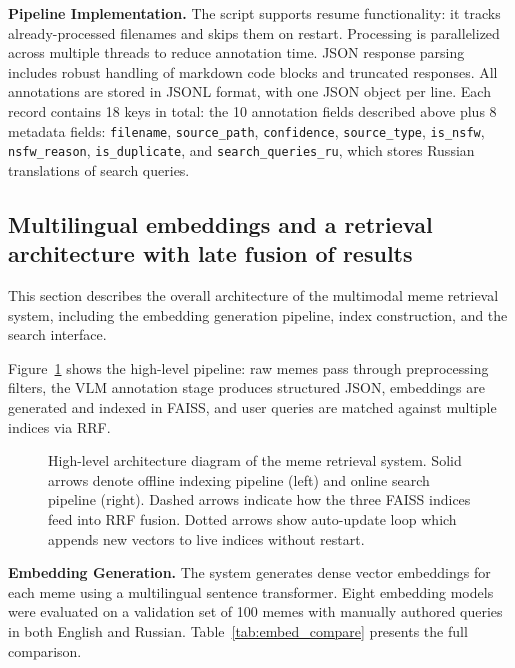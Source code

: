 \documentclass[a4paper,12pt]{article}
\begin{document}
\textbf{Pipeline Implementation.} The script supports resume functionality: it tracks already-processed filenames and skips them on restart. Processing is parallelized across multiple threads to reduce annotation time. JSON response parsing includes robust handling of markdown code blocks and truncated responses. All annotations are stored in JSONL format, with one JSON object per line. Each record contains 18 keys in total: the 10 annotation fields described above plus 8 metadata fields: \texttt{filename}, \texttt{source\_path}, \texttt{confidence}, \texttt{source\_type}, \texttt{is\_nsfw}, \texttt{nsfw\_reason}, \texttt{is\_duplicate}, and \texttt{search\_queries\_ru}, which stores Russian translations of search queries.

\subsection{Multilingual embeddings and a retrieval architecture with late fusion of results}
\label{sec:arch}

This section describes the overall architecture of the multimodal meme retrieval system, including the embedding generation pipeline, index construction, and the search interface.

Figure~\ref{fig:architecture} shows the high-level pipeline: raw memes pass through preprocessing filters, the VLM annotation stage produces structured JSON, embeddings are generated and indexed in FAISS, and user queries are matched against multiple indices via RRF.

\begin{figure}[H]
\centering
\resizebox{\textwidth}{!}{}
\caption{High-level architecture diagram of the meme retrieval system. Solid arrows denote offline indexing pipeline (left) and online search pipeline (right). Dashed arrows indicate how the three FAISS indices feed into RRF fusion. Dotted arrows show auto-update loop which appends new vectors to live indices without restart.}
\label{fig:architecture}
\end{figure}

\textbf{Embedding Generation.} The system generates dense vector embeddings for each meme using a multilingual sentence transformer. Eight embedding models were evaluated on a validation set of 100 memes with manually authored queries in both English and Russian. Table~\ref{tab:embed_compare} presents the full comparison.
\end{document}
